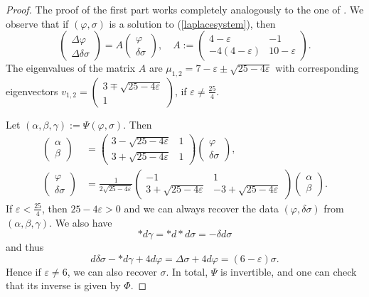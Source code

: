 \documentclass[12pt]{scrartcl}
\theoremstyle{plain}
\theoremstyle{definition}
\begin{document}
\begin{proof}
The proof of the first part works completely analogously to the one of \cite[Lem.~5.2]{nearlykaehler}. We observe that if $(\varphi,\sigma)$ is a solution to (\ref{laplacesystem}), then
\[\begin{pmatrix}
   \Delta\varphi\\
   \Delta\delta\sigma
  \end{pmatrix}=A\begin{pmatrix}
   \varphi\\
   \delta\sigma
  \end{pmatrix},\quad A:=\begin{pmatrix}
   4-\varepsilon&-1\\
   -4(4-\varepsilon)&10-\varepsilon
  \end{pmatrix}.
\]
The eigenvalues of the matrix $A$ are $\mu_{1,2}=7-\varepsilon\pm\sqrt{25-4\varepsilon}$ with corresponding eigenvectors $v_{1,2}=(\begin{smallmatrix}3\mp\sqrt{25-4\varepsilon}\\1\end{smallmatrix})$, if $\varepsilon\neq\frac{25}{4}$.

Let $(\alpha,\beta,\gamma):=\Psi(\varphi,\sigma)$. Then
\begin{align*}
\begin{pmatrix}\alpha\\\beta\end{pmatrix}&=\begin{pmatrix}3-\sqrt{25-4\varepsilon}&1\\3+\sqrt{25-4\varepsilon}&1\end{pmatrix}\begin{pmatrix}\varphi\\\delta\sigma\end{pmatrix},\\
\begin{pmatrix}\varphi\\\delta\sigma\end{pmatrix}&=\frac{1}{2\sqrt{25-4\varepsilon}}\begin{pmatrix}-1&1\\3+\sqrt{25-4\varepsilon}&-3+\sqrt{25-4\varepsilon}\end{pmatrix}\begin{pmatrix}\alpha\\\beta\end{pmatrix}.
\end{align*}
If $\varepsilon<\frac{25}{4}$, then $25-4\varepsilon>0$ and we can always recover the data $(\varphi,\delta\sigma)$ from $(\alpha,\beta,\gamma)$. We also have
\[\ast d\gamma=\ast d\ast d\sigma=-\delta d\sigma\]
and thus
\[d\delta\sigma-\ast d\gamma+4d\varphi=\Delta\sigma+4d\varphi=(6-\varepsilon)\sigma.\]
Hence if $\varepsilon\neq6$, we can also recover $\sigma$. In total, $\Psi$ is invertible, and one can check that its inverse is given by $\Phi$.


\end{proof}
\end{document}
